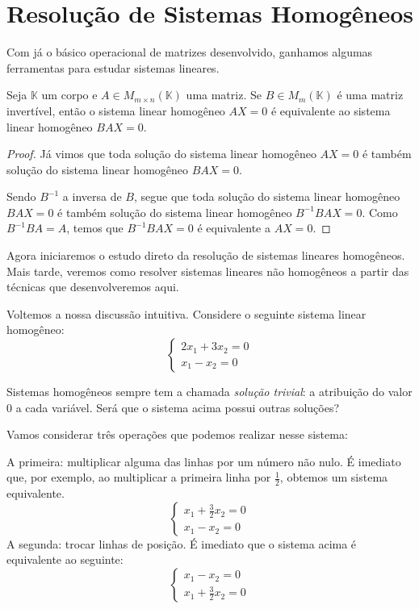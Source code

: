 \section{Resolução de Sistemas Homogêneos}
Com já o básico operacional de matrizes desenvolvido, ganhamos algumas ferramentas para estudar sistemas lineares.

\begin{proposition}
    Seja $\mathbb K$ um corpo e $A\in M_{m \times n}(\mathbb K)$ uma matriz. Se $B \in M_{m}(\mathbb K)$ é uma matriz invertível, então o sistema linear homogêneo $AX=0$ é equivalente ao sistema linear homogêneo $BAX=0$.
\end{proposition}
\begin{proof}
    Já vimos que toda solução do sistema linear homogêneo $AX=0$ é também solução do sistema linear homogêneo $BAX=0$.
    
    Sendo $B^{-1}$ a inversa de $B$, segue que toda solução do sistema linear homogêneo $BAX=0$ é também solução do sistema linear homogêneo $B^{-1}BAX=0$.
    Como $B^{-1}BA=A$, temos que $B^{-1}BAX=0$ é equivalente a $AX=0$.
\end{proof}

Agora iniciaremos o estudo direto da resolução de sistemas lineares homogêneos.
Mais tarde, veremos como resolver sistemas lineares não homogêneos a partir das técnicas que desenvolveremos aqui.

Voltemos a nossa discussão intuitiva.
Considere o seguinte sistema linear homogêneo:
\begin{equation*}
    \begin{cases}
        2x_1 + 3x_2 = 0 \\
        x_1 - x_2 = 0
    \end{cases}
\end{equation*}

Sistemas homogêneos sempre tem a chamada \emph{solução trivial}: a atribuição do valor $0$ a cada variável. Será que o sistema acima possui outras soluções? 

Vamos considerar três operações que podemos realizar nesse sistema:

A primeira: multiplicar alguma das linhas por um número não nulo.
É imediato que, por exemplo, ao multiplicar a primeira linha por $\frac{1}{2}$, obtemos um sistema equivalente.
\begin{equation*}
    \begin{cases}
        x_1 + \frac{3}{2}x_2 = 0 \\
        x_1 - x_2 = 0
    \end{cases}
\end{equation*}
A segunda: trocar linhas de posição. É imediato que o sistema acima é equivalente ao seguinte:
\begin{equation*}
    \begin{cases}
        x_1 - x_2 = 0 \\
        x_1 + \frac{3}{2}x_2 = 0
    \end{cases}
\end{equation*}

